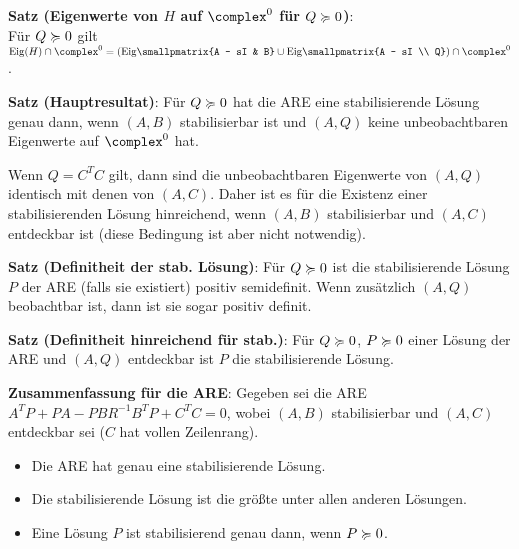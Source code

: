 \textbf{Satz (Eigenwerte von $H$ auf $\complex^0$ für $Q \succcurlyeq 0$)}:\\
Für $Q \succcurlyeq 0$ gilt
$\Eig(H) \cap \complex^0 = \left(\Eig\!\smallpmatrix{A - sI & B} \cup
\Eig\!\smallpmatrix{A - sI \\ Q}\right) \cap \complex^0$.

\linie

\textbf{Satz (Hauptresultat)}:
Für $Q \succcurlyeq 0$ hat die ARE eine stabilisierende Lösung genau dann,
wenn $(A, B)$ stabilisierbar ist und
$(A, Q)$ keine unbeobachtbaren Eigenwerte auf $\complex^0$ hat.

Wenn $Q = C^T C$ gilt, dann sind die unbeobachtbaren Eigenwerte von $(A, Q)$ identisch mit denen
von $(A, C)$.
Daher ist es für die Existenz einer stabilisierenden Lösung hinreichend,
wenn $(A, B)$ stabilisierbar und $(A, C)$ entdeckbar ist
(diese Bedingung ist aber nicht notwendig).

\linie

\textbf{Satz (Definitheit der stab. Lösung)}:
Für $Q \succcurlyeq 0$ ist die stabilisierende Lösung $P$ der ARE (falls sie existiert) positiv semidefinit.
Wenn zusätzlich $(A, Q)$ beobachtbar ist, dann ist sie sogar positiv definit.

\linie

\textbf{Satz (Definitheit hinreichend für stab.)}:
Für $Q \succcurlyeq 0$, $P \succcurlyeq 0$ einer Lösung der ARE und $(A, Q)$ entdeckbar ist $P$ die
stabilisierende Lösung.

\linie

\textbf{Zusammenfassung für die ARE}:
Gegeben sei die ARE $A^T P + PA - PBR^{-1} B^T P + C^T C = 0$,
wobei $(A, B)$ stabilisierbar und $(A, C)$ entdeckbar sei
($C$ hat vollen Zeilenrang).
\begin{itemize}
    \item
    Die ARE hat genau eine stabilisierende Lösung.
    
    \item
    Die stabilisierende Lösung ist die größte unter allen anderen Lösungen.
    
    \item
    Eine Lösung $P$ ist stabilisierend genau dann, wenn $P \succcurlyeq 0$.
\end{itemize}

\linie

